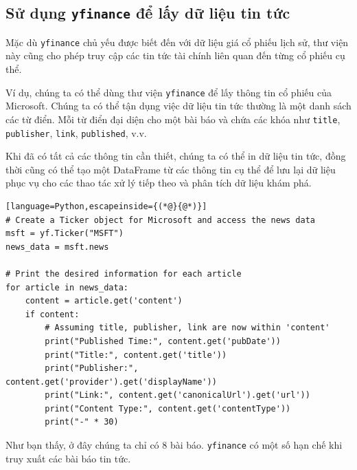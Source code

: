 \subsection{Sử dụng \texttt{yfinance} để lấy dữ liệu tin tức}

Mặc dù \texttt{yfinance} chủ yếu được biết đến với dữ liệu giá cổ phiếu lịch sử, thư viện này cũng cho phép truy cập các tin tức tài chính liên quan đến từng cổ phiếu cụ thể.

Ví dụ, chúng ta có thể dùng thư viện \texttt{yfinance} để lấy thông tin cổ phiếu của Microsoft. Chúng ta có thể tận dụng việc dữ liệu tin tức thường là một danh sách các từ điển. Mỗi từ điển đại diện cho một bài báo và chứa các khóa như \texttt{title}, \texttt{publisher}, \texttt{link}, \texttt{published}, v.v.

Khi đã có tất cả các thông tin cần thiết, chúng ta có thể in dữ liệu tin tức, đồng thời cũng có thể tạo một DataFrame từ các thông tin cụ thể để lưu lại dữ liệu phục vụ cho các thao tác xử lý tiếp theo và phân tích dữ liệu khám phá.

\begin{lstlisting}[language=Python,escapeinside={(*@}{@*)}]
# Create a Ticker object for Microsoft and access the news data
msft = yf.Ticker("MSFT")
news_data = msft.news

# Print the desired information for each article
for article in news_data:
    content = article.get('content')
    if content:
        # Assuming title, publisher, link are now within 'content'
        print("Published Time:", content.get('pubDate'))
        print("Title:", content.get('title'))  
        print("Publisher:", content.get('provider').get('displayName'))  
        print("Link:", content.get('canonicalUrl').get('url'))
        print("Content Type:", content.get('contentType'))
        print("-" * 30)
\end{lstlisting}

Như bạn thấy, ở đây chúng ta chỉ có 8 bài báo. \texttt{yfinance} có một số hạn chế khi truy xuất các bài báo tin tức.

